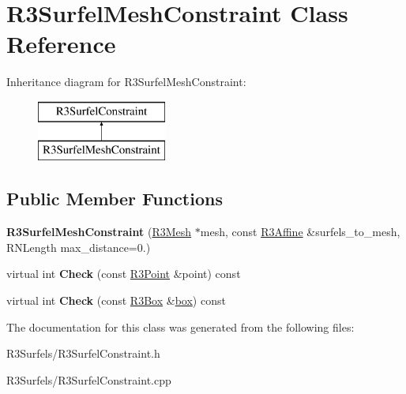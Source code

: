 \hypertarget{class_r3_surfel_mesh_constraint}{}\section{R3\+Surfel\+Mesh\+Constraint Class Reference}
\label{class_r3_surfel_mesh_constraint}
Inheritance diagram for R3\+Surfel\+Mesh\+Constraint\+:\begin{figure}[H]
\begin{center}
\leavevmode
\includegraphics[height=2.000000cm]{class_r3_surfel_mesh_constraint}
\end{center}
\end{figure}
\subsection*{Public Member Functions}
\begin{DoxyCompactItemize}
\item 
{\bfseries R3\+Surfel\+Mesh\+Constraint} (\hyperlink{class_r3_mesh}{R3\+Mesh} $\ast$mesh, const \hyperlink{class_r3_affine}{R3\+Affine} \&surfels\+\_\+to\+\_\+mesh, R\+N\+Length max\+\_\+distance=0.)\hypertarget{class_r3_surfel_mesh_constraint_ac90a12721551d30e96f2f962b23feef0}{}\label{class_r3_surfel_mesh_constraint_ac90a12721551d30e96f2f962b23feef0}

\item 
virtual int {\bfseries Check} (const \hyperlink{class_r3_point}{R3\+Point} \&point) const \hypertarget{class_r3_surfel_mesh_constraint_ac6685f7355d4a6e65904dd2947d7855d}{}\label{class_r3_surfel_mesh_constraint_ac6685f7355d4a6e65904dd2947d7855d}

\item 
virtual int {\bfseries Check} (const \hyperlink{class_r3_box}{R3\+Box} \&\hyperlink{structbox}{box}) const \hypertarget{class_r3_surfel_mesh_constraint_adce5786e323257464ce27667e852427c}{}\label{class_r3_surfel_mesh_constraint_adce5786e323257464ce27667e852427c}

\end{DoxyCompactItemize}


The documentation for this class was generated from the following files\+:\begin{DoxyCompactItemize}
\item 
R3\+Surfels/R3\+Surfel\+Constraint.\+h\item 
R3\+Surfels/R3\+Surfel\+Constraint.\+cpp\end{DoxyCompactItemize}
